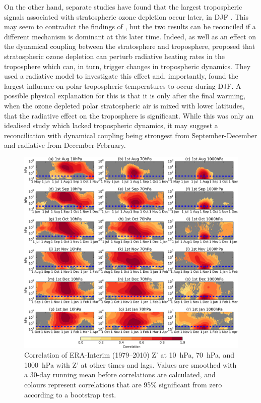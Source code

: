 On the other hand, separate studies have found that the largest tropospheric
signals associated with stratospheric ozone depletion occur later, in DJF
\citep{WMO2010}. This may seem to contradict the findings of \citet{Shaw2010},
but the two results can be reconciled if a different mechanism is dominant at
this later time. Indeed, as well as an effect on the dynamical coupling between
the stratosphere and troposphere, \citet{Grise2009} proposed that stratospheric
ozone depletion can perturb radiative heating rates in the troposphere which
can, in turn, trigger changes in tropospheric dynamics. They used a radiative
model to investigate this effect and, importantly, found the largest influence
on polar tropospheric temperatures to occur during DJF. A possible physical
explanation for this is that it is only after the final warming, when the ozone
depleted polar stratospheric air is mixed with lower latitudes, that the
radiative effect on the troposphere is significant. While this was only an
idealised study which lacked tropospheric dynamics, it may suggest a
reconciliation with dynamical coupling being strongest from September-December
and radiative from December-February.

\begin{figure}[p] \vspace*{-3cm} \centering
   \noindent\includegraphics[width=\textwidth]{figures/chapter-seasonal/lag_height_corr_obs.pdf}
 \caption[Lag-height correlation of $Z'$ at 10~hPa and 1000~hPa.]{Correlation of
   ERA-Interim (1979--2010) Z' at 10~hPa, 70~hPa, and 1000~hPa with Z' at other
   times and lags. Values are smoothed with a 30-day running mean before
   correlations are calculated, and colours represent correlations that are 95\%
   significant from zero according to a bootstrap test.}
 \label{fig:lag_height_corr_obs}
\end{figure}

